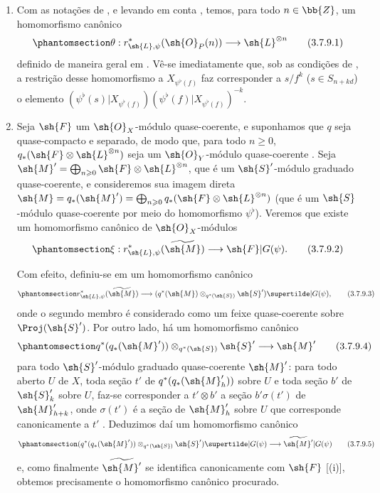 \documentclass[oneside,10pt]{amsart}
\renewcommand{\geq}{\geqslant}
\let\EGAOriginalLabel\label
\renewcommand{\label}[1]{\phantomsection\EGAOriginalLabel{#1}}
\begin{document}
\begin{remarks}[3.7.9]
\label{II.3.7.9}
\medskip\noindent
\begin{enumerate}
  \item[(i)] Com as notações de , e levando em conta , temos, para todo $n\in\bb{Z}$, um homomorfismo canônico
    \[
    \label{II.3.7.9.1}
      \theta:r_{\sh{L},\psi}^*(\sh{O}_P(n))\longrightarrow
      \sh{L}^{\otimes n}
    \tag{3.7.9.1}
    \]
    definido de maneira geral em .
    Vê-se imediatamente que, sob as condições de , a restrição desse homomorfismo a $X_{\psi^\flat(f)}$ faz corresponder a $s/f^k$ ($s\in S_{n+kd}$) o elemento $(\psi^\flat(s)|X_{\psi^\flat(f)})(\psi^\flat(f)|X_{\psi^\flat(f)})^{-k}$.
  \item[(ii)] Seja $\sh{F}$ um $\sh{O}_X$-módulo quase-coerente, e suponhamos que $q$ seja quase-compacto e separado, de modo que, para todo $n\geq0$, $q_*(\sh{F}\otimes\sh{L}^{\otimes n})$ seja um $\sh{O}_Y$-módulo quase-coerente .
    Seja $\sh{M}'=\bigoplus_{n\geq0}\sh{F}\otimes\sh{L}^{\otimes n}$, que é um $\sh{S}'$-módulo graduado quase-coerente, e consideremos sua imagem direta $\sh{M}=q_*(\sh{M}')=\bigoplus_{n\geq0}q_*(\sh{F}\otimes\sh{L}^{\otimes n})$ (que é um $\sh{S}$-módulo quase-coerente por meio do homomorfismo $\psi^\flat$).
    Veremos que existe um homomorfismo canônico de $\sh{O}_X$-módulos
    \[
    \label{II.3.7.9.2}
      \xi:r_{\sh{L},\psi}^*(\widetilde{\sh{M}})
      \longrightarrow\sh{F}|G(\psi).
    \tag{3.7.9.2}
    \]

    Com efeito, definiu-se em  um homomorfismo canônico
    \[
    \label{II.3.7.9.3}
      r_{\sh{L},\psi}^*(\widetilde{\sh{M}})
      \longrightarrow
      (q^*(\sh{M})\otimes_{q^*(\sh{S})}\sh{S}')\supertilde|G(\psi),
    \tag{3.7.9.3}
    \]
    onde o segundo membro é considerado como um feixe quase-coerente sobre $\Proj(\sh{S}')$.
    Por outro lado, há um homomorfismo canônico
    \[
    \label{II.3.7.9.4}
      q^*(q_*(\sh{M}'))\otimes_{q^*(\sh{S})}\sh{S}'
      \longrightarrow\sh{M}'
    \tag{3.7.9.4}
    \]
    para todo $\sh{S}'$-módulo graduado quase-coerente $\sh{M}'$:
    para todo aberto $U$ de $X$, toda seção $t'$ de $q^*(q_*(\sh{M}'_h))$ sobre $U$ e toda seção $b'$ de $\sh{S}'_k$ sobre $U$, faz-se corresponder a $t'\otimes b'$ a seção $b'\sigma(t')$ de $\sh{M}'_{h+k}$, onde $\sigma(t')$ é a seção de $\sh{M}'_h$ sobre $U$ que corresponde canonicamente a $t'$ .
    Deduzimos daí um homomorfismo canônico
    \[
    \label{II.3.7.9.5}
      (q^*(q_*(\sh{M}'))\otimes_{q^*(\sh{S})}\sh{S}')\supertilde|G(\psi)
      \longrightarrow\widetilde{\sh{M}'}|G(\psi)
    \tag{3.7.9.5}
    \]
    e, como finalmente $\widetilde{\sh{M}'}$ se identifica canonicamente com $\sh{F}$ [(i)], obtemos precisamente o homomorfismo canônico procurado.


\end{enumerate}
\end{remarks}
\end{document}
